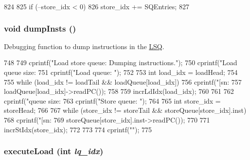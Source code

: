 \begin{DoxyCode}
824 {
825     if (--store_idx < 0)
826         store_idx += SQEntries;
827 }
\end{DoxyCode}
\hypertarget{classOzoneLSQ_a80587b4fe043bbe1995536cb3b361588}{
\subsubsection[{dumpInsts}]{\setlength{\rightskip}{0pt plus 5cm}void dumpInsts ()}}
\label{classOzoneLSQ_a80587b4fe043bbe1995536cb3b361588}
Debugging function to dump instructions in the \hyperlink{classLSQ}{LSQ}. 


\begin{DoxyCode}
748 {
749     cprintf("Load store queue: Dumping instructions.\n");
750     cprintf("Load queue size: %
751     cprintf("Load queue: ");
752 
753     int load_idx = loadHead;
754 
755     while (load_idx != loadTail && loadQueue[load_idx]) {
756         cprintf("[sn:%
757                 loadQueue[load_idx]->readPC());
758 
759         incrLdIdx(load_idx);
760     }
761 
762     cprintf("\nStore queue size: %
763     cprintf("Store queue: ");
764 
765     int store_idx = storeHead;
766 
767     while (store_idx != storeTail && storeQueue[store_idx].inst) {
768         cprintf("[sn:%
769                 storeQueue[store_idx].inst->readPC());
770 
771         incrStIdx(store_idx);
772     }
773 
774     cprintf("\n");
775 }
\end{DoxyCode}
\hypertarget{classOzoneLSQ_a091a4d1788ce66e51ceb888bbd85ac08}{
\subsubsection[{executeLoad}]{ executeLoad (int {\em lq\_\-idx})}}
\label{classOzoneLSQ_a091a4d1788ce66e51ceb888bbd85ac08}




